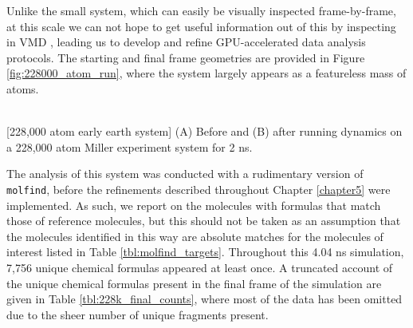 Unlike the small system, which can easily be visually inspected frame-by-frame, at this scale we can not hope to get useful information out of this by inspecting in VMD \cite{vmd}, leading us to develop and refine GPU-accelerated data analysis protocols.
The starting and final frame geometries are provided in Figure \ref{fig:228000_atom_run}, where the system largely appears as a featureless mass of atoms. 

\begin{flushleft}
\begin{multiFigure}
     \\
[228,000 atom early earth system]{
(A) Before and (B) after running dynamics on a 228,000 atom Miller experiment system for 2 ns.
}
\label{fig:228000_atom_run}
\end{multiFigure}
\end{flushleft}

The analysis of this system was conducted with a rudimentary version of \verb|molfind|, before the refinements described throughout Chapter \ref{chapter5} were implemented.
As such, we report on the molecules with formulas that match those of reference molecules, but this should not be taken as an assumption that the molecules identified in this way are absolute matches for the molecules of interest listed in Table \ref{tbl:molfind_targets}.
Throughout this 4.04 ns simulation, 7,756 unique chemical formulas appeared at least once.
A truncated account of the unique chemical formulas present in the final frame of the simulation are given in Table \ref{tbl:228k_final_counts}, where most of the data has been omitted due to the sheer number of unique fragments present.


